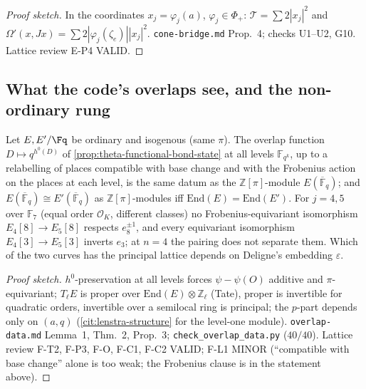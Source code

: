\begin{proof}[Proof sketch] In the coordinates $x_j = \varphi_j(a)$, $\varphi_j\in\Phi_+$: $\mathcal T = \sum2|x_j|^2$ and $\Omega'(x,Jx) = \sum2|\varphi_j(\zeta_e)||x_j|^2$. %
\texttt{cone-bridge.md} Prop.~4; checks U1--U2, G10. Lattice review E-P4 VALID.
\end{proof}

\subsection{What the code's overlaps see, and the non-ordinary rung}

\begin{proposition}
\label{prop:gkp-overlaps-see-order} 
Let $E,E'/\Fq$ be ordinary and isogenous (same $\pi$). The overlap function $D\mapsto q^{h^0(D)}$ of \cref{prop:theta-functional-bond-state} at all levels $\mathbb F_{q^k}$, up
to a relabelling of places compatible with base change and with the Frobenius action on the places at each level, is the same datum as the $\mathbb Z[\pi]$-module
$E(\overline{\mathbb F}_q)$; and $E(\overline{\mathbb F}_q)\cong E'(\overline{\mathbb F}_q)$ as $\mathbb Z[\pi]$-modules iff $\mathrm{End}(E) = \mathrm{End}(E')$. For $j = 4,5$
over $\mathbb F_7$ (equal order $\mathcal O_K$, different classes) no Frobenius-equivariant isomorphism $E_4[8]\to E_5[8]$ respects $e_8^{\pm1}$, and every equivariant
isomorphism $E_4[3]\to E_5[3]$ inverts $e_3$; at $n = 4$ the pairing does not separate them. Which of the two curves has the principal lattice depends on Deligne's embedding
$\varepsilon$.
\end{proposition}
\begin{proof}[Proof sketch] $h^0$-preservation at all levels forces $\psi-\psi(O)$ additive and $\pi$-equivariant; $T_\ell E$ is proper over $\mathrm{End}(E)\otimes\mathbb %
Z_\ell$ (Tate), proper is invertible for quadratic orders, invertible over a semilocal ring is principal; the $p$-part depends only on $(a,q)$ (\cref{cit:lenstra-structure} for %
the level-one module). \texttt{overlap-data.md} Lemma~1, Thm.~2, Prop.~3; \texttt{check\_overlap\_data.py} ($40/40$). Lattice review F-T2, F-P3, F-O, F-C1, F-C2 VALID; F-L1 MINOR
(``compatible with base change'' alone is too weak; the Frobenius clause is in the statement above).
\end{proof}
